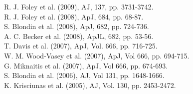 \documentclass[11pt]{article}
\begin{document}
R. J. Foley et al. (2009), AJ, 137, pp. 3731-3742.  \\
R. J. Foley et al. (2008), ApJ, 684, pp. 68-87.  \\
S. Blondin et al. (2008), ApJ, 682, pp. 724-736.  \\
A. C. Becker et al. (2008), ApJL, 682, pp. 53-56. \\
T. Davis et al. (2007), ApJ, Vol. 666, pp. 716-725.  \\
W. M. Wood-Vasey et al. (2007), ApJ, Vol 666, pp. 694-715. \\
G. Miknaitis et al. (2007), ApJ, Vol 666, pp. 674-693. \\
S. Blondin et al. (2006), AJ, Vol 131, pp. 1648-1666. \\
K. Krisciunas et al. (2005), AJ, Vol. 130, pp. 2453-2472. \\



%



%
\end{document}
